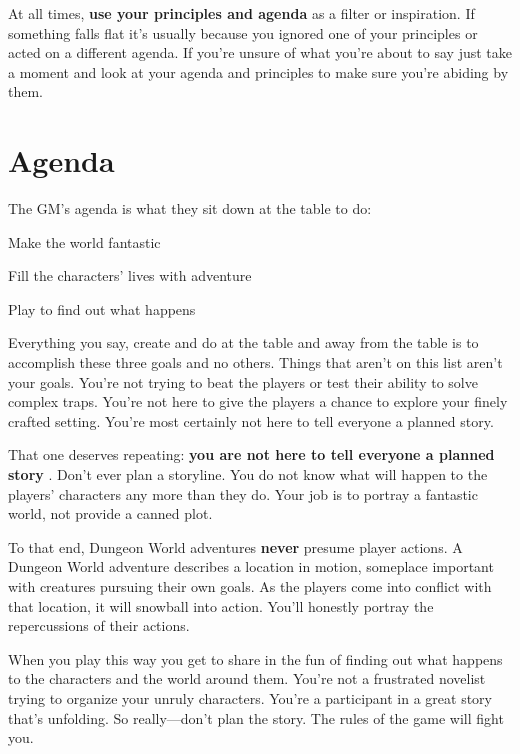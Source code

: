        

At all times, {\bf use your principles and agenda}  as a filter or inspiration. If something falls flat it's usually because you ignored one of your principles or acted on a different agenda. If you're unsure of what you're about to say just take a moment and look at your agenda and principles to make sure you're abiding by them.

       
\section{Agenda}   
       

The GM's agenda is what they sit down at the table to do:

       
\startitemize[1,packed]
         
\item Make the world fantastic

         
\item Fill the characters' lives with adventure

         
\item Play to find out what happens

       
\stopitemize
       

Everything you say, create and do at the table and away from the table is to accomplish these three goals and no others. Things that aren't on this list aren't your goals. You're not trying to beat the players or test their ability to solve complex traps. You're not here to give the players a chance to explore your finely crafted setting. You're most certainly not here to tell everyone a planned story.

       

That one deserves repeating: {\bf you are not here to tell everyone a planned story} . Don't ever plan a storyline. You do not know what will happen to the players' characters any more than they do. Your job is to portray a fantastic world, not provide a canned plot.

       

To that end, Dungeon World adventures {\bf never}  presume player actions. A Dungeon World adventure describes a location in motion, someplace important with creatures pursuing their own goals. As the players come into conflict with that location, it will snowball into action. You'll honestly portray the repercussions of their actions.

       

When you play this way you get to share in the fun of finding out what happens to the characters and the world around them. You're not a frustrated novelist trying to organize your unruly characters. You're a participant in a great story that's unfolding. So really—don't plan the story. The rules of the game will fight you.

